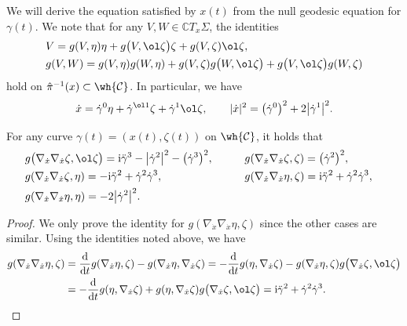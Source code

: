 We will derive the equation satisfied by $x(t)$ from the null geodesic equation for $\gamma(t)$. We note that for any $V, W\in \mathbb{C}T_x\Sigma$, the identities
\begin{align*}
&V=g(V, \eta)\eta+g\bigl(V, \ol\zeta\bigr)\zeta+g(V, \zeta)\ol\zeta, \\
&g(V, W)=g(V, \eta)g(W, \eta)+g(V, \zeta)g\bigl(W, \ol\zeta\bigr)+g\bigl(V, \ol\zeta\bigr)g(W, \zeta)
\end{align*}
hold on $\hat\pi^{-1}(x)\subset\wh{\mathcal{C}}$. In particular, we have
\begin{equation}\label{x-zeta-eta}
\dot x=\dot\gamma^0\eta+\dot\gamma^{\ol1}\zeta+\dot\gamma^1\ol\zeta, \qquad |\dot x|^2=\bigl(\dot\gamma^0\bigr)^2+2\bigl|\dot\gamma^1\bigr|^2.
\end{equation}
\begin{Lemma}
For any curve $\gamma(t)=(x(t), \zeta(t))$ on $\wh{\mathcal{C}}$, it holds that
\begin{alignat}{3}
&g\bigl(\nabla_{\dot x}\nabla_{\dot x}\zeta, \ol\zeta\bigr) ={\rm i}\ddot\gamma^3-\bigl|\dot\gamma^2\bigr|^2-\bigl(\dot\gamma^3\bigr)^2, \qquad&&
g(\nabla_{\dot x}\nabla_{\dot x}\zeta, \zeta) =\bigl(\dot\gamma^2\bigr)^2,& \nonumber \\
&g(\nabla_{\dot x}\nabla_{\dot x}\zeta, \eta) =-{\rm i}\ddot\gamma^2+\dot\gamma^2\dot\gamma^3, \qquad&&
g(\nabla_{\dot x}\nabla_{\dot x}\eta, \zeta) ={\rm i}\ddot\gamma^2+\dot\gamma^2\dot\gamma^3, &\nonumber \\
&g(\nabla_{\dot x}\nabla_{\dot x}\eta, \eta) =-2\bigl|\dot\gamma^2\bigr|^2.&\label{nabla-zeta-eta}
\end{alignat}
\end{Lemma}
\begin{proof}
We only prove the identity for $g(\nabla_{\dot x}\nabla_{\dot x}\eta, \zeta)$ since the other cases are similar. Using the identities noted above, we have
\begin{align*}
g(\nabla_{\dot x}\nabla_{\dot x}\eta, \zeta)
&=\frac{{\rm d}}{{\rm d}t}g(\nabla_{\dot x}\eta, \zeta)-g(\nabla_{\dot x}\eta, \nabla_{\dot x}\zeta) =-\frac{{\rm d}}{{\rm d}t}g(\eta, \nabla_{\dot x}\zeta)-g(\nabla_{\dot x}\eta, \zeta)g\bigl(\nabla_{\dot x}\zeta, \ol\zeta\bigr) \\
&=-\frac{{\rm d}}{{\rm d}t}g(\eta, \nabla_{\dot x}\zeta)+g(\eta, \nabla_{\dot x}\zeta)g\bigl(\nabla_{\dot x}\zeta, \ol\zeta\bigr)
={\rm i}\ddot\gamma^2+\dot\gamma^2\dot\gamma^3.
\tag*{\qed}
\end{align*}
\renewcommand{\qed}{}
\end{proof}

